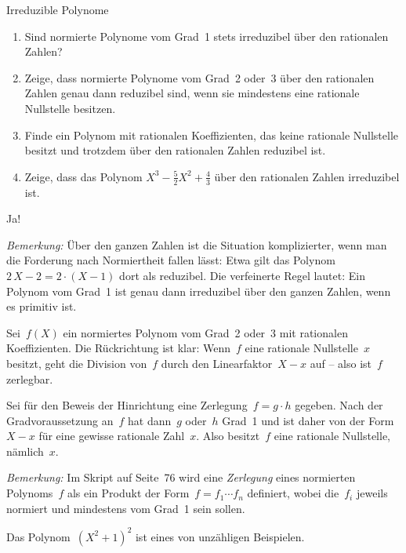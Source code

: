 \documentclass{algblatt}
\begin{document}
\ifloesungen\newpage\fi
\begin{aufgabe}{Irreduzible Polynome}
\begin{enumerate}
\item Sind normierte Polynome vom Grad~1 stets irreduzibel über den rationalen
Zahlen?
\item Zeige, dass normierte Polynome vom Grad~2 oder~3 über den rationalen
Zahlen genau dann reduzibel sind, wenn sie mindestens eine rationale Nullstelle
besitzen.
\item Finde ein Polynom mit rationalen Koeffizienten, das keine rationale
Nullstelle besitzt und trotzdem über den rationalen Zahlen reduzibel ist.
\item Zeige, dass das Polynom $X^3 - \frac{5}{2}X^2 + \frac{4}{3}$ über den
rationalen Zahlen irreduzibel ist.
\end{enumerate}

\begin{loesungE}
\item Ja!

\emph{Bemerkung:} Über den ganzen Zahlen ist die Situation komplizierter, wenn
man die Forderung nach Normiertheit fallen lässt: Etwa
gilt das Polynom~$2\,X - 2 = 2 \cdot (X - 1)$ dort als reduzibel. Die
verfeinerte Regel lautet: Ein Polynom vom Grad~1 ist genau dann irreduzibel
über den ganzen Zahlen, wenn es primitiv ist.

\item Sei~$f(X)$ ein normiertes Polynom vom Grad~2 oder~3 mit rationalen
Koeffizienten. Die Rückrichtung ist klar: Wenn~$f$ eine rationale
Nullstelle~$x$ besitzt, geht die Division von~$f$ durch den Linearfaktor~$X-x$
auf -- also ist~$f$ zerlegbar.

Sei für den Beweis der Hinrichtung eine Zerlegung~$f = g \cdot h$ gegeben. Nach
der Gradvoraussetzung an~$f$ hat dann~$g$ oder~$h$ Grad~1 und ist daher von der
Form~$X-x$ für eine gewisse rationale Zahl~$x$. Also besitzt~$f$ eine rationale
Nullstelle, nämlich~$x$.

\emph{Bemerkung:} Im Skript auf Seite~76 wird eine \emph{Zerlegung} eines
normierten Polynoms~$f$ als ein Produkt der Form~$f = f_1 \cdots f_n$
definiert, wobei die~$f_i$ jeweils normiert und mindestens vom Grad~1 sein
sollen.

\item Das Polynom~$(X^2+1)^2$ ist eines von unzähligen Beispielen.


\end{loesungE}
\end{aufgabe}
\end{document}

